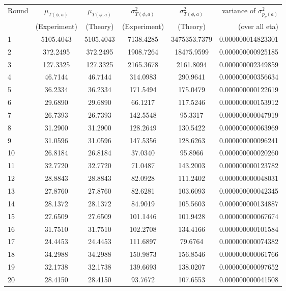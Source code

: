 \begin{center}
\begin{scriptsize}
\begin{tabular}{l*{4}{c}r} \label{table:T_a_variable_a_variable_phi_full_codebook}
Round & $\mu_{T(\phi,a)}$ &  $\mu_{T(\phi,a)}$ & $\sigma^2_{T(\phi,a)}$ & $\sigma^2_{T(\phi,a)}$ & variance of $\sigma^2_{p_{\eta}(a)}$ \\
 & (Experiment) &  (Theory) & (Experiment) & (Theory) & (over all eta) \\
\hline
1 & 5105.4043 & 5105.4043 & 7138.4285 & 3475353.7379 & 0.000000014823301\\
2 & 372.2495 & 372.2495 & 1908.7264 & 18475.9599 & 0.000000000925185\\
3 & 127.3325 & 127.3325 & 2165.3678 & 2161.8094 & 0.000000002349859\\
4 & 46.7144 & 46.7144 & 314.0983 & 290.9641 & 0.000000000356634\\
5 & 36.2334 & 36.2334 & 171.5494 & 175.0479 & 0.000000000122619\\
6 & 29.6890 & 29.6890 & 66.1217 & 117.5246 & 0.000000000153912\\
7 & 26.7393 & 26.7393 & 142.5548 & 95.3317 & 0.000000000047919\\
8 & 31.2900 & 31.2900 & 128.2649 & 130.5422 & 0.000000000063969\\
9 & 31.0596 & 31.0596 & 147.5356 & 128.6263 & 0.000000000096241\\
10 & 26.8184 & 26.8184 & 37.0340 & 95.8966 & 0.000000000020260\\
11 & 32.7720 & 32.7720 & 71.0487 & 143.2003 & 0.000000000123782\\
12 & 28.8843 & 28.8843 & 82.0928 & 111.2402 & 0.000000000048031\\
13 & 27.8760 & 27.8760 & 82.6281 & 103.6093 & 0.000000000042345\\
14 & 28.1372 & 28.1372 & 84.9019 & 105.5603 & 0.000000000134887\\
15 & 27.6509 & 27.6509 & 101.1446 & 101.9428 & 0.000000000067674\\
16 & 31.7510 & 31.7510 & 102.2708 & 134.4166 & 0.000000000101584\\
17 & 24.4453 & 24.4453 & 111.6897 & 79.6764 & 0.000000000074382\\
18 & 34.2988 & 34.2988 & 150.9873 & 156.8546 & 0.000000000061766\\
19 & 32.1738 & 32.1738 & 139.6693 & 138.0207 & 0.000000000097652\\
20 & 28.4150 & 28.4150 & 93.7672 & 107.6553 & 0.000000000041508\\

\end{tabular}
\end{scriptsize}
\end{center}
